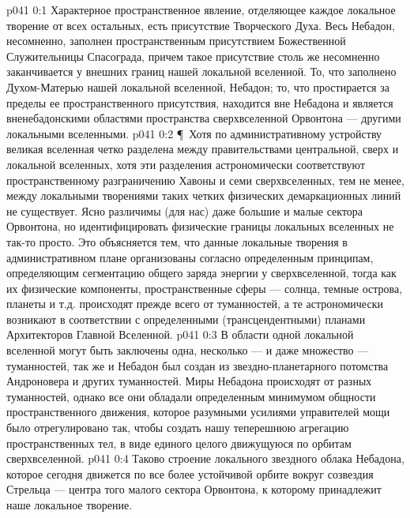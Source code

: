 \author{Архангел}
\vs p041 0:1 Характерное пространственное явление, отделяющее каждое локальное творение от всех остальных, есть присутствие Творческого Духа. Весь Небадон, несомненно, заполнен пространственным присутствием Божественной Служительницы Спасограда, причем такое присутствие столь же несомненно заканчивается у внешних границ нашей локальной вселенной. То, что заполнено Духом\hyp{}Матерью нашей локальной вселенной,  Небадон; то, что простирается за пределы ее пространственного присутствия, находится вне Небадона и является вненебадонскими областями пространства сверхвселенной Орвонтона --- другими локальными вселенными.
\vs p041 0:2 \P\ Хотя по административному устройству великая вселенная четко разделена между правительствами центральной, сверх и локальной вселенных, хотя эти разделения астрономически соответствуют пространственному разграничению Хавоны и семи сверхвселенных, тем не менее, между локальными творениями таких четких физических демаркационных линий не существует. Ясно различимы (для нас) даже большие и малые сектора Орвонтона, но идентифицировать физические границы локальных вселенных не так\hyp{}то просто. Это объясняется тем, что данные локальные творения в административном плане организованы согласно определенным  принципам, определяющим сегментацию общего заряда энергии у сверхвселенной, тогда как их физические компоненты, пространственные сферы --- солнца, темные острова, планеты и т.д. происходят прежде всего от туманностей, а те астрономически возникают в соответствии с определенными  (трансцендентными) планами Архитекторов Главной Вселенной.
\vs p041 0:3 В области одной локальной вселенной могут быть заключены одна, несколько --- и даже множество --- туманностей, так же и Небадон был создан из звездно\hyp{}планетарного потомства Андроновера и других туманностей. Миры Небадона происходят от разных туманностей, однако все они обладали определенным минимумом общности пространственного движения, которое разумными усилиями управителей мощи было отрегулировано так, чтобы создать нашу теперешнюю агрегацию пространственных тел, в виде единого целого движущуюся по орбитам сверхвселенной.
\vs p041 0:4 Таково строение локального звездного облака Небадона, которое сегодня движется по все более устойчивой орбите вокруг созвездия Стрельца --- центра того малого сектора Орвонтона, к которому принадлежит наше локальное творение.
